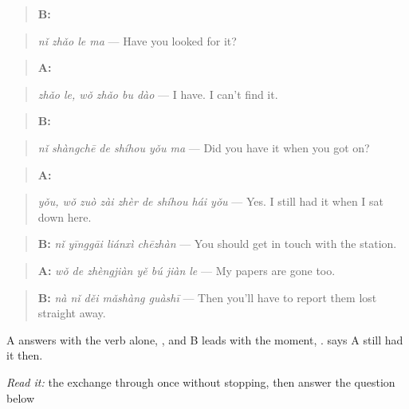\begin{quote}
\textbf{B:} 
\end{quote}

\begin{quote}
\emph{nǐ zhǎo le ma} — Have you looked for it?
\end{quote}

\begin{quote}
\textbf{A:}  
\end{quote}

\begin{quote}
\emph{zhǎo le, wǒ zhǎo bu dào} — I have. I can't find it.
\end{quote}

\begin{quote}
\textbf{B:} 
\end{quote}

\begin{quote}
\emph{nǐ shàngchē de shíhou yǒu ma} — Did you have it when you got on?
\end{quote}

\begin{quote}
\textbf{A:}  
\end{quote}

\begin{quote}
\emph{yǒu, wǒ zuò zài zhèr de shíhou hái yǒu} — Yes. I still had it when I sat down here.
\end{quote}

\begin{quote}
\textbf{B:} \emph{nǐ yīnggāi liánxì chēzhàn} — You should get in touch with the station.
\end{quote}

\begin{quote}
\textbf{A:} \emph{wǒ de zhèngjiàn yě bú jiàn le} — My papers are gone too.
\end{quote}

\begin{quote}
\textbf{B:} \emph{nà nǐ děi mǎshàng guàshī} — Then you'll have to report them lost straight away.
\end{quote}

A answers with the verb alone, , and B leads with the moment, .  says A still had it then.

\begin{tcolorbox}[breakable,skin=enhanced,colback=orange!6,colframe=orange!45!black,boxrule=0.5pt,arc=1mm,left=6pt,right=6pt,top=4pt,bottom=4pt,fonttitle=\bfseries,title={Read this}]
\emph{Read it:} the exchange through once without stopping, then answer the question below
\end{tcolorbox}

